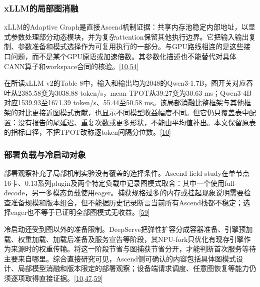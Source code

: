 \documentclass[
  UTF8,
  zihao=5]{ctexart}
\begin{document}
\hypertarget{xllmux7684ux5c40ux90e8ux56feux6d88ux878d}{%
\subsubsection{xLLM的局部图消融}\label{xllmux7684ux5c40ux90e8ux56feux6d88ux878d}}

xLLM的Adaptive
Graph是直接Ascend机制证据：共享内存池稳定内部地址，以显式参数处理部分动态模块，并为复杂attention保留其他执行边界。它把输入输出复制、参数准备和模式选择作为可复用执行的一部分。与GPU路线相连的是这些接口问题，而不是某个GPU原语或加速倍数。其参数化描述也不能替代对具体CANN算子和workspace合同的核验。{[}\protect\hyperlink{ref-liu2025xllm}{10},\protect\hyperlink{ref-cann910update}{54}{]}

在所读xLLM v2的Table
8中，输入和输出均为2048的Qwen3-1.7B，图开关对应吞吐从2385.58变为3038.88
token/s，mean TPOT从39.27变为30.63 ms；Qwen3-4B对应1539.93至1671.39
token/s、55.44至50.58
ms。该局部消融比整框架与其他框架的对比更接近图模式贡献，也显示不同模型收益幅度不同。但它仍只覆盖表中配置：没有报告的尾延迟、重复次数或更多形状，不能由平均值补出。本文保留原表的指标口径，不把TPOT改称逐token间隔分位数。{[}\protect\hyperlink{ref-liu2025xllm}{10}{]}

\hypertarget{ux90e8ux7f72ux8d1fux8f7dux4e0eux51b7ux542fux52a8ux5bf9ux8c61}{%
\subsubsection{部署负载与冷启动对象}\label{ux90e8ux7f72ux8d1fux8f7dux4e0eux51b7ux542fux52a8ux5bf9ux8c61}}

部署观察补充了局部机制实验没有覆盖的选择条件。Ascend field
study在单节点16卡、0.13系列plugin及两个特定负载中记录图模式取舍：其中一个使用full-decode，另一多模态负载使用eager。捕获规格过多的内存或挂起现象说明需要检查准备规模和版本组合，但不能据历史记录断言当前所有Ascend栈都不稳定；选择eager也不等于已证明全部图模式无收益。{[}\protect\hyperlink{ref-yu2026ascendfield}{59}{]}

冷启动还受到图以外的准备限制。DeepServe把弹性扩容分成容器准备、引擎预加载、权重加载、加载后准备及服务宣告等阶段，其NPU-fork只优化有现存引擎作为来源时的权重传输。将这一阶段节省与图捕获节省分开，才能判断首次服务等待主要来自哪里。综合直接研究可见，Ascend侧可确认的内容包括具体图模式设计、局部模型消融和版本限定的部署观察；设备端请求调度、任意图恢复等能力仍须逐项取得直接证据。{[}\protect\hyperlink{ref-liu2025xllm}{10},\protect\hyperlink{ref-hu2025deepserve}{47},\protect\hyperlink{ref-yu2026ascendfield}{59}{]}
\end{document}
